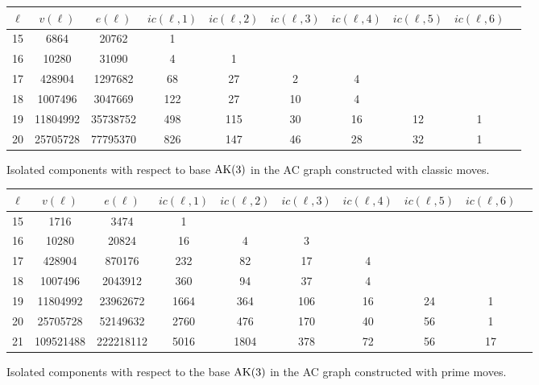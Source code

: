 \begin{figure}
	\begin{tabular}{|c|c|c|c|c|c|c|c|c|c|}
		\hline
		$\ell$ & $v(\ell)$ & $e(\ell)$ & $ic(\ell,1)$ & $ic(\ell,2)$ & $ic(\ell,3)$ & $ic(\ell,4)$ & $ic(\ell,5)$ & $ic(\ell,6)$ \\ \hline
		15 & 6864 & 20762 & 1 &  &  &  &  &  \\ \hline
		16 & 10280 & 31090 & 4 & 1 &  &  &  &  \\ \hline
		17 & 428904 & 1297682 & 68 & 27 & 2 & 4 &  &  \\ \hline
		18 & 1007496 & 3047669 & 122 & 27 & 10 & 4 &  &  \\ \hline
		19 & 11804992 & 35738752 & 498 & 115 & 30 & 16 & 12 & 1 \\ \hline
		20 & 25705728 & 77795370 & 826 & 147 & 46 & 28 & 32 & 1 \\ \hline
	\end{tabular}
	\caption{Isolated components with respect to base \(\text{AK}(3)\) in the AC graph constructed with classic moves.}
	\label{fig:ak_classic_persistence}
\end{figure}

\begin{figure}
	\begin{tabular}{|c|c|c|c|c|c|c|c|c|c|}
		\hline
		$\ell$ & $v(\ell)$ & $e(\ell)$ & $ic(\ell,1)$ & $ic(\ell,2)$ & $ic(\ell,3)$ & $ic(\ell,4)$ & $ic(\ell,5)$ & $ic(\ell,6)$ \\ \hline
		15 & 1716 & 3474 & 1 &  &  &  &  &  \\ \hline
		16 & 10280 & 20824 & 16 & 4 & 3 &  &  &  \\ \hline
		17 & 428904 & 870176 & 232 & 82 & 17 & 4 &  &  \\ \hline
		18 & 1007496 & 2043912 & 360 & 94 & 37 & 4 &  &  \\ \hline
		19 & 11804992 & 23962672 & 1664 & 364 & 106 & 16 & 24 & 1 \\ \hline
		20 & 25705728 & 52149632 & 2760 & 476 & 170 & 40 & 56 & 1 \\ \hline
		21 & 109521488 & 222218112 & 5016 & 1804 & 378 & 72 & 56 & 17 \\ \hline
	\end{tabular}
	\caption{Isolated components with respect to the base \(\text{AK}(3)\) in the AC graph constructed with prime moves.}
	\label{fig:ak_prime_persistence}
\end{figure}

